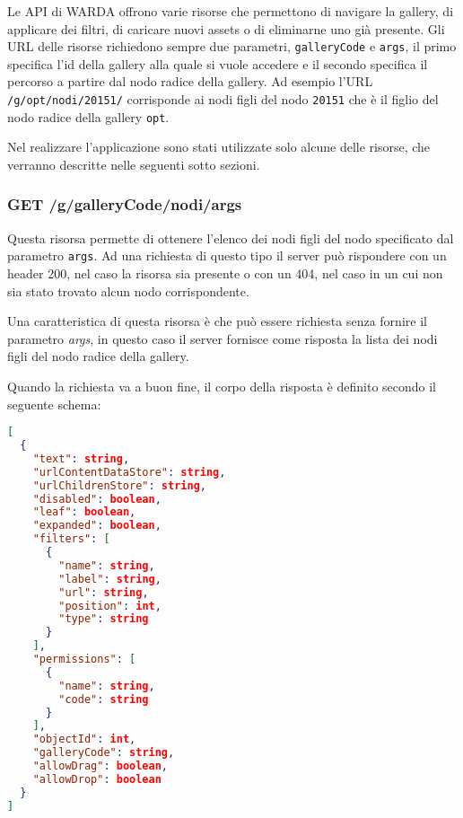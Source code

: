 Le API di WARDA offrono varie risorse che permettono di navigare la gallery, di applicare dei filtri, di caricare nuovi assets o di eliminarne uno già presente.
Gli URL delle risorse richiedono sempre due parametri, \texttt{galleryCode} e \texttt{args}, il primo specifica l'id della gallery alla quale si vuole accedere e il secondo specifica il percorso a partire dal nodo radice della gallery.
Ad esempio l'URL \texttt{/g/opt/nodi/20151/} corrisponde ai nodi figli del nodo \texttt{20151} che è il figlio del nodo radice della gallery \texttt{opt}.

Nel realizzare l'applicazione sono stati utilizzate solo alcune delle risorse, che verranno descritte nelle seguenti sotto sezioni. 

\subsubsection{GET /g/{galleryCode}/nodi/{args}}\label{sec:nodes}

Questa risorsa permette di ottenere l'elenco dei nodi figli del nodo specificato dal parametro \texttt{args}.
Ad una richiesta di questo tipo il server può rispondere con un header 200, nel caso la risorsa sia presente o con un 404, nel caso in un cui non sia stato trovato alcun nodo corrispondente.

Una caratteristica di questa risorsa è che può essere richiesta senza fornire il parametro \textsl{args}, in questo caso il server fornisce come risposta la lista dei nodi figli del nodo radice della gallery.

Quando la richiesta va a buon fine, il corpo della risposta è definito secondo il seguente schema:
\begin{lstlisting}[language=JSON, caption=JSON Schema di GET /g/{galleryCode}/nodi/{args}]
[
  {
    "text": string,
    "urlContentDataStore": string,
    "urlChildrenStore": string,
    "disabled": boolean,
    "leaf": boolean,
    "expanded": boolean,
    "filters": [
      {
        "name": string,
        "label": string,
        "url": string,
        "position": int,
        "type": string
      }
    ],
    "permissions": [
      {
        "name": string,
        "code": string
      }
    ],
    "objectId": int,
    "galleryCode": string,
    "allowDrag": boolean,
    "allowDrop": boolean
  }
]
\end{lstlisting}
\FloatBarrier

